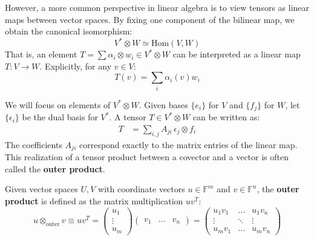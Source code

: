   However, a more common perspective in linear algebra is to view tensors as linear maps between vector spaces. By fixing one component of the bilinear map, we obtain the canonical isomorphism:
  \begin{equation}
    V^* \otimes W \simeq \text{Hom}(V, W) \label{linmaps_are_tensors}
  \end{equation}
  That is, an element $T = \sum \alpha_i \otimes w_i \in V^* \otimes W$ can be interpreted as a linear map $T: V \to W$. Explicitly, for any $v \in V$:
  \[ T(v) = \sum_i \alpha_i(v) w_i \]

  We will focus on elements of $V^* \otimes W$. Given bases $\{e_i\}$ for $V$ and $\{f_j\}$ for $W$, let $\{\epsilon_i\}$ be the dual basis for $V^*$. A tensor $T \in V^* \otimes W$ can be written as:
  \begin{align*}
    T &= \sum_{i, j} A_{ji} \, \epsilon_j \otimes f_i
  \end{align*}
  The coefficients $A_{ji}$ correspond exactly to the matrix entries of the linear map. This realization of a tensor product between a covector and a vector is often called the \textbf{outer product}.

  \begin{definition}
    Given vector spaces $U, V$ with coordinate vectors $u \in \mathbb{F}^m$ and $v \in \mathbb{F}^n$, the \textbf{outer product} is defined as the matrix multiplication $u v^T$:
    \[u \otimes_{\text{outer}} v \equiv u v^T = 
    \begin{pmatrix} u_1 \\ \vdots \\ u_m \end{pmatrix} 
    \begin{pmatrix} v_1 & \dots & v_n \end{pmatrix} 
    = \begin{pmatrix}
    u_1 v_1 & \dots & u_1 v_n \\
    \vdots & \ddots & \vdots \\
    u_m v_1 & \dots & u_m v_n 
    \end{pmatrix}\]
  \end{definition}

